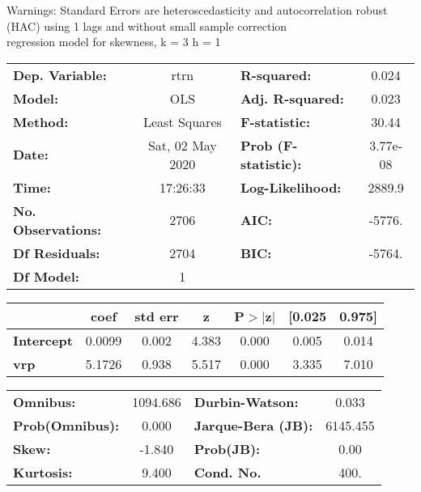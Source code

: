 Warnings: \newline
 [1] Standard Errors are heteroscedasticity and autocorrelation robust (HAC) using 1 lags and without small sample correction\\ 

regression model for skewness, k = 3 h = 1\begin{center}
\begin{tabular}{lclc}
\toprule
\textbf{Dep. Variable:}    &       rtrn       & \textbf{  R-squared:         } &     0.024   \\
\textbf{Model:}            &       OLS        & \textbf{  Adj. R-squared:    } &     0.023   \\
\textbf{Method:}           &  Least Squares   & \textbf{  F-statistic:       } &     30.44   \\
\textbf{Date:}             & Sat, 02 May 2020 & \textbf{  Prob (F-statistic):} &  3.77e-08   \\
\textbf{Time:}             &     17:26:33     & \textbf{  Log-Likelihood:    } &    2889.9   \\
\textbf{No. Observations:} &        2706      & \textbf{  AIC:               } &    -5776.   \\
\textbf{Df Residuals:}     &        2704      & \textbf{  BIC:               } &    -5764.   \\
\textbf{Df Model:}         &           1      & \textbf{                     } &             \\
\bottomrule
\end{tabular}
\begin{tabular}{lcccccc}
                   & \textbf{coef} & \textbf{std err} & \textbf{z} & \textbf{P$> |$z$|$} & \textbf{[0.025} & \textbf{0.975]}  \\
\midrule
\textbf{Intercept} &       0.0099  &        0.002     &     4.383  &         0.000        &        0.005    &        0.014     \\
\textbf{vrp}       &       5.1726  &        0.938     &     5.517  &         0.000        &        3.335    &        7.010     \\
\bottomrule
\end{tabular}
\begin{tabular}{lclc}
\textbf{Omnibus:}       & 1094.686 & \textbf{  Durbin-Watson:     } &    0.033  \\
\textbf{Prob(Omnibus):} &   0.000  & \textbf{  Jarque-Bera (JB):  } & 6145.455  \\
\textbf{Skew:}          &  -1.840  & \textbf{  Prob(JB):          } &     0.00  \\
\textbf{Kurtosis:}      &   9.400  & \textbf{  Cond. No.          } &     400.  \\
\bottomrule
\end{tabular}
\end{center}

